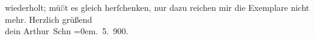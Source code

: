 \begin{ledgroupsized}[t]{13cm}
{{{                  wiederholt}}}\label{T_L01038_1h}; mü\textcolor{gray}{ß}t es {\pb}gleich herſchenken, nur
               dazu reichen mir die Exemplare nicht mehr.\pend
           \pstart
           Herzlich grüßend{\\[\baselineskip]}dein \spacefill\mbox{Arthur Schn}\pend
           \leftskip=0em{}. 5. 900.\pend
           \endnumbering{}\end{ledgroupsized}  \newcommand{\dateiname}{L01038}\newcommand{\titel}{Arthur Schnitzler an Hermann Bahr, 19. 5. 1900}\newcommand{\editorInnen}{ Kurt Ifkovits,  Martin Anton Müller}
      